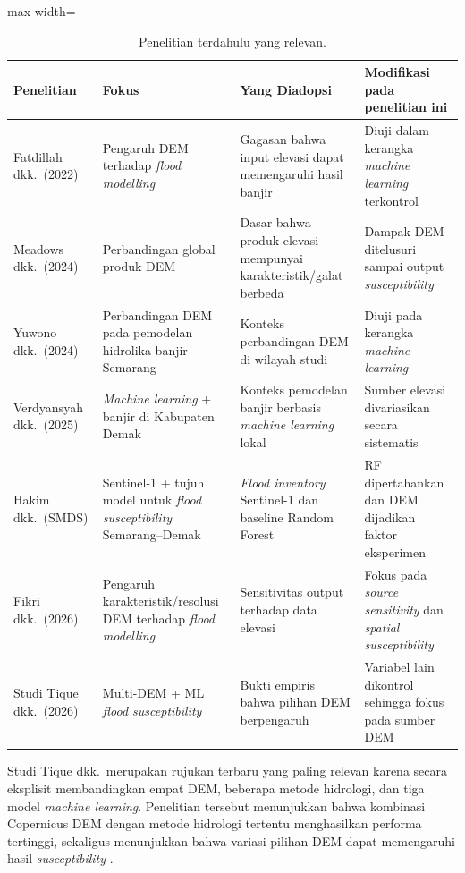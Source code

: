 \documentclass[12pt]{article}
\begin{document}
\begin{table}[ht]
\centering
\caption{Penelitian terdahulu yang relevan.}
\label{tab:prior}
\begin{adjustbox}{max width=\textwidth}
\begin{tabular}{>{\raggedright}p{2.6cm}
                >{\raggedright}p{3.6cm}
                >{\raggedright}p{3.8cm}
                >{\raggedright\arraybackslash}p{3.8cm}}
\toprule
\textbf{Penelitian} & \textbf{Fokus} & \textbf{Yang Diadopsi} & \textbf{Modifikasi pada penelitian ini} \\
\midrule
Fatdillah dkk.\ (2022) \cite{fatdillah2022} & Pengaruh DEM terhadap \textit{flood modelling} & Gagasan bahwa input elevasi dapat memengaruhi hasil banjir & Diuji dalam kerangka \textit{machine learning} terkontrol \\
Meadows dkk.\ (2024) \cite{meadows2024} & Perbandingan global produk DEM & Dasar bahwa produk elevasi mempunyai karakteristik/galat berbeda & Dampak DEM ditelusuri sampai output \textit{susceptibility} \\
Yuwono dkk.\ (2024) \cite{yuwono2024} & Perbandingan DEM pada pemodelan hidrolika banjir Semarang & Konteks perbandingan DEM di wilayah studi & Diuji pada kerangka \textit{machine learning} \\
Verdyansyah dkk.\ (2025) \cite{verdyansyah2025} & \textit{Machine learning} + banjir di Kabupaten Demak & Konteks pemodelan banjir berbasis \textit{machine learning} lokal & Sumber elevasi divariasikan secara sistematis \\
Hakim dkk.\ (SMDS) \cite{hakim2026} & Sentinel-1 + tujuh model untuk \textit{flood susceptibility} Semarang--Demak & \textit{Flood inventory} Sentinel-1 dan baseline Random Forest & RF dipertahankan dan DEM dijadikan faktor eksperimen \\
Fikri dkk.\ (2026) \cite{fikri2026} & Pengaruh karakteristik/resolusi DEM terhadap \textit{flood modelling} & Sensitivitas output terhadap data elevasi & Fokus pada \textit{source sensitivity} dan \textit{spatial susceptibility} \\
Studi Tique dkk.\ (2026) \cite{Tique2026} & Multi-DEM + ML \textit{flood susceptibility} & Bukti empiris bahwa pilihan DEM berpengaruh & Variabel lain dikontrol sehingga fokus pada sumber DEM \\
\bottomrule
\end{tabular}
\end{adjustbox}
\end{table}

Studi Tique dkk.\ merupakan rujukan terbaru yang paling relevan karena
secara eksplisit membandingkan empat DEM, beberapa metode hidrologi, dan tiga
model \textit{machine learning}. Penelitian tersebut menunjukkan bahwa
kombinasi Copernicus DEM dengan metode hidrologi tertentu menghasilkan
performa tertinggi, sekaligus menunjukkan bahwa variasi pilihan DEM
dapat memengaruhi hasil \textit{susceptibility} \cite{Tique2026}.
\end{document}
